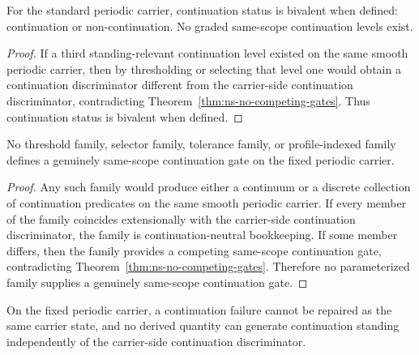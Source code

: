 \begin{corollary}
\label{cor:ns-binary-continuation-status}
For the standard periodic carrier, continuation status is bivalent when defined: continuation or
non-continuation. No graded same-scope continuation levels exist.
\end{corollary}

\begin{proof}
If a third standing-relevant continuation level existed on the same smooth periodic carrier, then by
thresholding or selecting that level one would obtain a continuation discriminator different from the
carrier-side continuation discriminator, contradicting Theorem~\ref{thm:ns-no-competing-gates}.
Thus continuation status is bivalent when defined.
\end{proof}

\begin{corollary}
\label{cor:ns-no-parameterized-gate}
No threshold family, selector family, tolerance family, or profile-indexed family defines a genuinely
same-scope continuation gate on the fixed periodic carrier.
\end{corollary}

\begin{proof}
Any such family would produce either a continuum or a discrete collection of continuation
predicates on the same smooth periodic carrier. If every member of the family coincides
extensionally with the carrier-side continuation discriminator, the family is continuation-neutral
bookkeeping. If some member differs, then the family provides a competing same-scope continuation
gate, contradicting Theorem~\ref{thm:ns-no-competing-gates}. Therefore no parameterized family
supplies a genuinely same-scope continuation gate.
\end{proof}

\begin{theorem}
\label{thm:ns-no-repair-generator}
On the fixed periodic carrier, a continuation failure cannot be repaired as the same carrier state, and
no derived quantity can generate continuation standing independently of the carrier-side continuation
discriminator.
\end{theorem}

